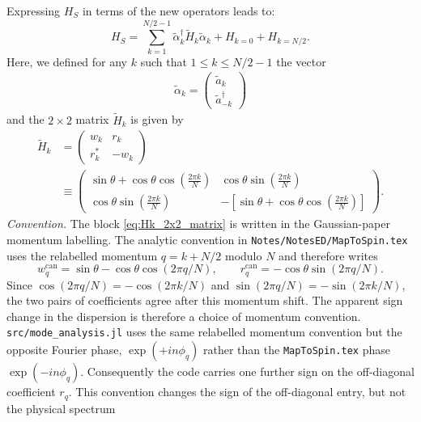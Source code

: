 Expressing $H_S$ in terms of the new operators leads to:
\begin{equation}
    H_S=\sum_{k=1}^{N/2-1} \tilde{\alpha}_k^\dagger \tilde{H}_k \tilde{\alpha}_k+ H_{k=0}+H_{k=N/2}.
\end{equation}
Here, we defined for any $k$ such that $1 \le k \le N/2-1$ the vector
\begin{align}
    \tilde{\alpha}_k =
    \begin{pmatrix}
        \tilde{a}_k\\
        \tilde{a}_{-k}^\dagger
    \end{pmatrix}
\end{align}
and the $2 \times 2$ matrix $\tilde{H}_k$ is given by
\begin{align}
    \tilde{H}_k
     &=
    \begin{pmatrix}
        w_k   &r_k\\
        r_k^* &-w_k
    \end{pmatrix}\nonumber\\
     &\equiv
    \begin{pmatrix}
        \sin\theta + \cos\theta \cos(\frac{2\pi k}{N})
         &
        \cos\theta \sin(\frac{2\pi k}{N})
        \\
        \cos\theta \sin(\frac{2\pi k}{N})
         &
        -\left[ \sin\theta + \cos\theta \cos(\frac{2\pi k}{N})\right]
    \end{pmatrix}.
    \label{eq:Hk_2x2_matrix}
\end{align}
\emph{Convention.}
The block \cref{eq:Hk_2x2_matrix} is written in the Gaussian-paper momentum
labelling. The analytic convention in \texttt{Notes/NotesED/MapToSpin.tex} uses
the relabelled momentum $q=k+N/2$ modulo $N$ and therefore writes
\begin{equation}
    w^{\mathrm{can}}_q=\sin\theta-\cos\theta\cos(2\pi q/N),\qquad
    r^{\mathrm{can}}_q=-\cos\theta\sin(2\pi q/N).
\end{equation}
Since $\cos(2\pi q/N)=-\cos(2\pi k/N)$ and
$\sin(2\pi q/N)=-\sin(2\pi k/N)$, the two pairs of coefficients agree after
this momentum shift. The apparent sign change in the dispersion is therefore a
choice of momentum convention.
\texttt{src/mode\_analysis.jl} uses the same relabelled momentum convention but
the opposite Fourier phase, $\exp(+in\phi_q)$ rather than the
\texttt{MapToSpin.tex} phase $\exp(-in\phi_q)$. Consequently the code carries
one further sign on the off-diagonal coefficient $r_q$. This convention changes
the sign of the off-diagonal entry, but not the physical spectrum
